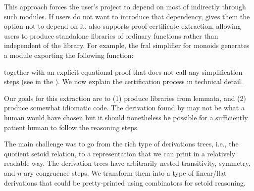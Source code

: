 This approach forces the user's project to depend on most of
\Frexlib{} indirectly through such modules.
If users do not want to introduce that dependency, \Frexlib{} gives
them the option not to depend on it.
%
\Frexlib{} also supports proof-certificate extraction,
allowing users to produce standalone libraries of ordinary \idris{} functions
rather than \FrexLemma{} independent of
the \Frexlib{} library. For example, the fral simplifier for monoids
generates a module exporting the following \idris{} function:
\begin{center}
\CertificateType{}
\end{center}
together with an explicit equational proof that does not call any \Frexlib{}
simplification steps (see  in the ).
We now explain the certification process in technical detail.

Our goals for this extraction are to (1) produce libraries from lemmata,
and (2) produce somewhat idiomatic \idris{} code.
%
The derivation found by \Frexlib{} may not be what a human would have
chosen but it should nonetheless be possible for a sufficiently patient
human to follow the reasoning steps.

The main challenge was to go from the rich type of derivations trees,
i.e., the quotient setoid relation, to a representation that we can
print in a relatively readable way. The derivation trees have
arbitrarily nested transitivity, symmetry, and $n$-ary congruence
steps.  We transform them into a type of linear/flat derivations that
could be pretty-printed using combinators for setoid
reasoning.

